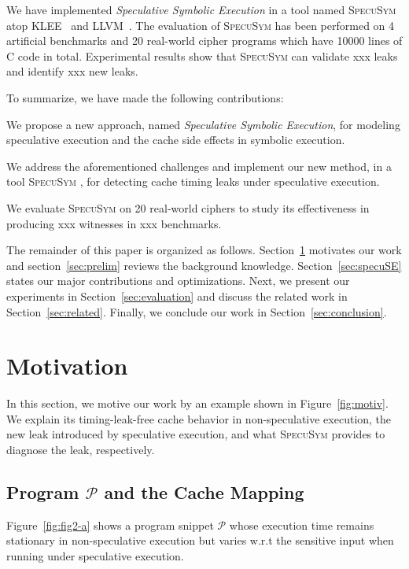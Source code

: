 \documentclass[sigconf, review]{acmart}
\newcommand{\SpecuSym}{\textsc{SpecuSym} }
\newcommand{\prog}{\mathcal{P}}
\begin{document}
We have implemented \textit{Speculative Symbolic Execution} in a tool named 
\SpecuSym atop KLEE~\cite{CadarDE08} and LLVM~\cite{LattnerA04}. The evaluation
of \SpecuSym has been performed on 4 artificial benchmarks and 20 real-world 
cipher programs which have 10000 lines of C code in total. Experimental results 
show that \SpecuSym can validate xxx leaks and identify xxx new leaks.


To summarize, we have made the following contributions:
\begin{compactitem}
  \item 
    We propose a new approach, named \emph{Speculative Symbolic Execution}, 
    for modeling speculative execution and the cache side effects in symbolic 
    execution.
  \item 
    We address the aforementioned challenges and implement our new method, 
    in a tool \SpecuSym, for detecting cache timing leaks under speculative 
    execution. 
  \item 
    We evaluate \SpecuSym on 20 real-world ciphers to study its 
    effectiveness in producing xxx witnesses in xxx benchmarks.
\end{compactitem}


The remainder of this paper is organized as follows. Section~\ref{sec:mtv} 
motivates our work and section~\ref{sec:prelim} reviews the background 
knowledge. Section~\ref{sec:specuSE} states our major contributions and
optimizations. Next, we present our experiments in Section~\ref{sec:evaluation} 
and discuss the related work in Section~\ref{sec:related}. Finally, we 
conclude our work in Section~\ref{sec:conclusion}.


\section{Motivation}
\label{sec:mtv}


In this section, we motive our work by an example shown in Figure~\ref{fig:motiv}. 
We explain its timing-leak-free cache behavior in non-speculative execution, the 
new leak introduced by speculative execution, and what \SpecuSym provides to 
diagnose the leak, respectively.


\subsection{Program ${\prog}$ and the Cache Mapping}
\label{sec:leak_example}

Figure~\ref{fig:fig2-a} shows a program snippet ${\prog}$ whose execution 
time remains stationary in non-speculative execution but varies w.r.t the 
sensitive input when running under speculative execution.
\end{document}

